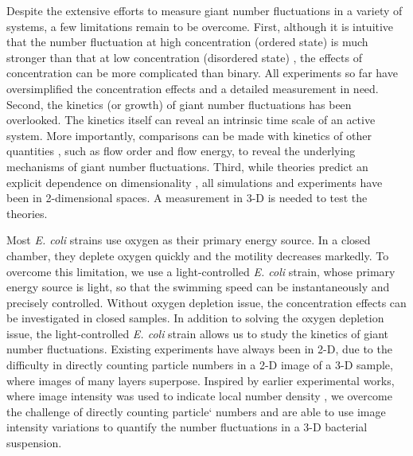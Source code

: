\documentclass[twocolumn,aps,pre,amsmath,amssymb,floatfix,longbibliography]{revtex4-1}
\begin{document}
Despite the extensive efforts to measure giant number fluctuations in a variety of systems, a few limitations remain to be overcome. First, although it is intuitive that the number fluctuation at high concentration (ordered state) is much stronger than that at low concentration (disordered state) \cite{PhysRevE.95.020601, Zhang13626}, the effects of concentration can be more complicated than binary. All experiments so far have oversimplified the concentration effects and a detailed measurement in need. Second, the kinetics (or growth) of giant number fluctuations has been overlooked. The kinetics itself can reveal an intrinsic time scale of an active system. More importantly, comparisons can be made with kinetics of other quantities \cite{Peng2020}, such as flow order and flow energy, to reveal the underlying mechanisms of giant number fluctuations. Third, while theories predict an explicit dependence on dimensionality \cite{doi:10.1146/annurev-conmatphys-031119-050752}, all simulations and experiments have been in 2-dimensional spaces. A measurement in 3-D is needed to test the theories.


Most \textit{E. coli} strains use oxygen as their primary energy source. In a closed chamber, they deplete oxygen quickly and the motility decreases markedly. To overcome this limitation, we use a light-controlled \textit{E. coli} strain, whose primary energy source is light, so that the swimming speed can be instantaneously and precisely controlled. Without oxygen depletion issue, the concentration effects can be investigated in closed samples. In addition to solving the oxygen depletion issue, the light-controlled \textit{E. coli} strain allows us to study the kinetics of giant number fluctuations. Existing experiments have always been in 2-D, due to the difficulty in directly counting particle numbers in a 2-D image of a 3-D sample, where images of many layers superpose. Inspired by earlier experimental works, where image intensity was used to indicate local number density \cite{PhysRevLett.106.018101, Schaller4488}, we overcome the challenge of directly counting particle` numbers and are able to use image intensity variations to quantify the number fluctuations in a 3-D bacterial suspension.
\end{document}
